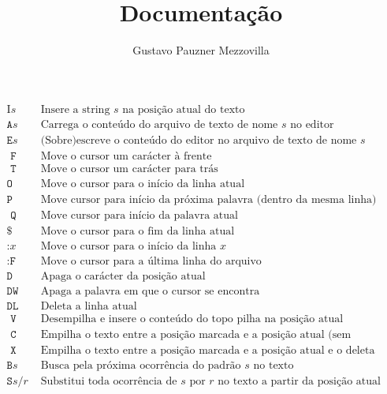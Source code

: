 \documentclass[a4paper, 11pt]{article}
\title{Documentação}
\author{Gustavo Pauzner Mezzovilla}
\begin{document}
\maketitle

$$
\begin{array}{|c|l|}
\hline \text {I}s & \text { Insere a string } s \text { na posição atual do texto } \\
\texttt {A}s & \text { Carrega o conteúdo do arquivo de texto de nome } s \text { no editor } \\
\texttt{E}s & \text { (Sobre)escreve o conteúdo do editor no arquivo de texto de nome } s \\
\texttt{ F } & \text { Move o cursor um carácter à frente } \\
\texttt{ T } & \text { Move o cursor um carácter para trás } \\
\texttt{O} & \text { Move o cursor para o início da linha atual } \\
\texttt{P} & \text { Move cursor para início da próxima palavra (dentro da mesma linha) } \\
\texttt{ Q } & \text { Move cursor para início da palavra atual } \\
\$ & \text { Move o cursor para o fim da linha atual } \\
\texttt{:}x & \text { Move o cursor para o início da linha } x \\
\texttt{:F} & \text { Move o cursor para a última linha do arquivo } \\
\texttt{D} & \text { Apaga o carácter da posição atual } \\
\texttt{DW} & \text { Apaga a palavra em que o cursor se encontra } \\
\texttt{DL} & \text { Deleta a linha atual } \\
\texttt{ V } & \text { Desempilha e insere o conteúdo do topo pilha na posição atual } \\
\texttt{ C } & \text { Empilha o texto entre a posição marcada e a posição atual (sem modificá-lo) } \\
\texttt{ X } & \text { Empilha o texto entre a posição marcada e a posição atual e o deleta } \\
\texttt{B}s & \text { Busca pela próxima ocorrência do padrão } s \text { no texto } \\
\texttt{S}s/r & \text { Substitui toda ocorrência de } s \text { por } r \text { no texto a partir da posição atual } \\

\end{array}$$
\end{document}
